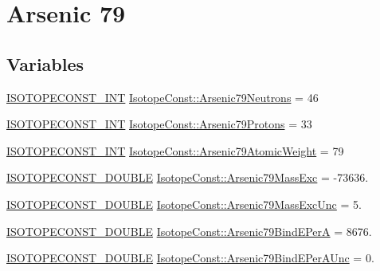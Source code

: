 \hypertarget{group___isotope_const-_arsenic-_as79}{}\section{Arsenic 79}
\label{group___isotope_const-_arsenic-_as79}
\subsection*{Variables}
\begin{DoxyCompactItemize}
\item 
\mbox{\hyperlink{group___isotope_const-_macros_ga5f18360b3e99483a35c32d789e62621c}{I\+S\+O\+T\+O\+P\+E\+C\+O\+N\+S\+T\+\_\+\+I\+NT}} \mbox{\hyperlink{group___isotope_const-_arsenic-_as79_gad48d520cbd4f66af27463c133c6e472c}{Isotope\+Const\+::\+Arsenic79\+Neutrons}} = 46
\item 
\mbox{\hyperlink{group___isotope_const-_macros_ga5f18360b3e99483a35c32d789e62621c}{I\+S\+O\+T\+O\+P\+E\+C\+O\+N\+S\+T\+\_\+\+I\+NT}} \mbox{\hyperlink{group___isotope_const-_arsenic-_as79_gaca6db41c3dc9278c93374d723fc20867}{Isotope\+Const\+::\+Arsenic79\+Protons}} = 33
\item 
\mbox{\hyperlink{group___isotope_const-_macros_ga5f18360b3e99483a35c32d789e62621c}{I\+S\+O\+T\+O\+P\+E\+C\+O\+N\+S\+T\+\_\+\+I\+NT}} \mbox{\hyperlink{group___isotope_const-_arsenic-_as79_ga52ae93dbfa843faf5442cb99bb6d963c}{Isotope\+Const\+::\+Arsenic79\+Atomic\+Weight}} = 79
\item 
\mbox{\hyperlink{group___isotope_const-_macros_ga8f45a7272ce02c0b4c65c44636ed719a}{I\+S\+O\+T\+O\+P\+E\+C\+O\+N\+S\+T\+\_\+\+D\+O\+U\+B\+LE}} \mbox{\hyperlink{group___isotope_const-_arsenic-_as79_gaad8bd63570267849cf575b246e0caaa9}{Isotope\+Const\+::\+Arsenic79\+Mass\+Exc}} = -\/73636.
\item 
\mbox{\hyperlink{group___isotope_const-_macros_ga8f45a7272ce02c0b4c65c44636ed719a}{I\+S\+O\+T\+O\+P\+E\+C\+O\+N\+S\+T\+\_\+\+D\+O\+U\+B\+LE}} \mbox{\hyperlink{group___isotope_const-_arsenic-_as79_ga3cc63ef8869b0c4a4cd31d1a6c4af8bd}{Isotope\+Const\+::\+Arsenic79\+Mass\+Exc\+Unc}} = 5.
\item 
\mbox{\hyperlink{group___isotope_const-_macros_ga8f45a7272ce02c0b4c65c44636ed719a}{I\+S\+O\+T\+O\+P\+E\+C\+O\+N\+S\+T\+\_\+\+D\+O\+U\+B\+LE}} \mbox{\hyperlink{group___isotope_const-_arsenic-_as79_ga19787190a6a057f4a1b30523f06e32d7}{Isotope\+Const\+::\+Arsenic79\+Bind\+E\+PerA}} = 8676.
\item 
\mbox{\hyperlink{group___isotope_const-_macros_ga8f45a7272ce02c0b4c65c44636ed719a}{I\+S\+O\+T\+O\+P\+E\+C\+O\+N\+S\+T\+\_\+\+D\+O\+U\+B\+LE}} \mbox{\hyperlink{group___isotope_const-_arsenic-_as79_gaf7369de6af843133832773005d2eeb57}{Isotope\+Const\+::\+Arsenic79\+Bind\+E\+Per\+A\+Unc}} = 0.

\end{DoxyCompactItemize}
